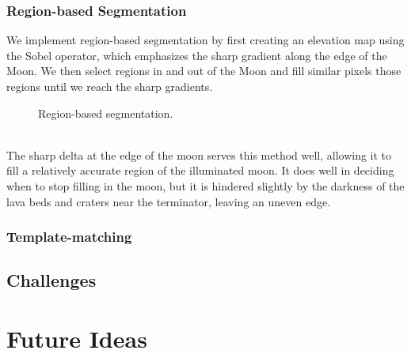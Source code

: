 \documentclass[]{article}
\begin{document}
\subsubsection*{Region-based Segmentation}
We implement region-based segmentation by first creating an elevation map using the Sobel operator, which emphasizes the sharp gradient along the edge of the Moon. We then select regions in and out of the Moon and fill similar pixels those regions until we reach the sharp gradients.
\begin{figure}[h]
\centering
{}
\caption{Region-based segmentation.}
\end{figure}
\\
The sharp delta at the edge of the moon serves this method well, allowing it to fill a relatively accurate region of the illuminated moon. It does well in deciding when to stop filling in the moon, but it is hindered slightly by the darkness of the lava beds and craters near the terminator, leaving an uneven edge.
\subsubsection*{Template-matching}
\subsection*{Challenges}
\section*{Future Ideas}
\end{document}
